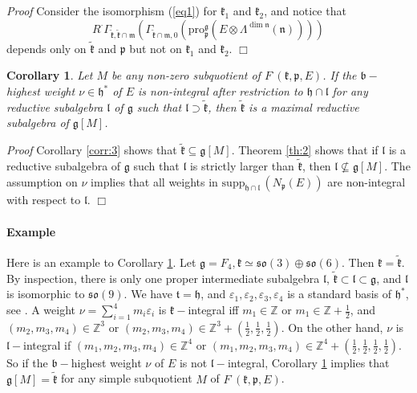 \documentclass[default]{./styles/svmult}
\newtheorem{cor}[theo]{Corollary}
\renewenvironment{proof}{ \emph{Proof}}{$\Box$}
\newcommand{\supp}{\mathrm{supp}}
\newcommand{\pro}{\mathrm{pro}}
\newcommand{\bb}{\mathfrak{b}}
\renewcommand{\gg}{\mathfrak{g}}
\newcommand{\hh}{\mathfrak{h}}
\newcommand{\kk}{\mathfrak{k}}
\renewcommand{\ll}{\mathfrak{l}}
\newcommand{\mm}{\mathfrak{m}}
\newcommand{\nn}{\mathfrak{n}}
\newcommand{\pp}{\mathfrak{p}}
\newcommand{\so}{\mathfrak{so}}
\renewcommand{\tt}{\mathfrak{t}}
\newcommand{\ZZ}{\mathbb{Z}}
\begin{document}
\begin{proof}
    Consider the isomorphism (\ref{eq1}) for $\kk_1$ and $\kk_2$, and notice that $$R^\cdot\Gamma_{\tilde{\kk},\tilde{\kk}\cap\mm}(\Gamma_{\tilde{\kk}\cap\mm,0}(\pro_\pp^\gg (E\otimes \Lambda^{\dim \nn}(\nn))))$$ depends only on $\tilde{\kk}$ and $\pp$ but not on $\kk_1$ and $\kk_2$.
\end{proof}

\begin{cor}\label{corr:5}
 Let $M$ be any non-zero subquotient of $F^{\cdot}(\kk,\pp,E)$. If the $\bb-$highest weight $\nu \in \hh^*$ of $E$ is non-integral after restriction to $\hh \cap \ll$ for any reductive subalgebra $\ll$ of $\gg$ such that $\ll \supset \tilde{\kk}$, then $\tilde{\kk}$ is a maximal reductive subalgebra of $\gg[M]$.
\end{cor}

\begin{proof}
 Corollary \ref{corr:3} shows that $\tilde{\kk} \subseteq \gg[M]$. Theorem \ref{th:2} shows that if $\ll$ is a reductive subalgebra of $\gg$ such that $\ll$ is strictly larger than $\tilde{\kk}$, then $\ll \nsubseteq \gg[M]$. The assumption on $\nu$ implies that all weights in $\supp_{\hh \cap \ll}\,(N_{\pp}(E))$ are non-integral with respect to $\ll$.   
\end{proof}

\paragraph{\textbf{Example}} Here is an example to Corollary \ref{corr:5}. Let $\gg = F_4, \kk \simeq \so(3) \oplus \so(6)$. Then $\kk = \tilde{\kk}$. By inspection, there is only one proper intermediate subalgebra $\ll$, $\tilde{\kk} \subset \ll \subset \gg$, and $\ll$ is isomorphic to $\so(9)$. We have $\tt = \hh$, and $\varepsilon_1,\varepsilon_2,\varepsilon_3,\varepsilon_4$ is a standard basis of $\hh^*$, see \cite{Bou}. A weight $\nu = \sum_{i = 1}^{4}m_i\varepsilon_i$ is $\kk-$integral iff $m_1 \in \ZZ$ or $m_1 \in \ZZ + \frac{1}{2}$, and $(m_2,m_3,m_4) \in \ZZ^3$ or $(m_2,m_3,m_4) \in \ZZ^3+(\frac{1}{2},\frac{1}{2},\frac{1}{2})$. On the other hand, $\nu$ is $\ll-$integral if $(m_1,m_2,m_3,m_4) \in \ZZ^4$ or $(m_1,m_2,m_3,m_4) \in \ZZ^4 + (\frac{1}{2},\frac{1}{2},\frac{1}{2},\frac{1}{2})$. So if the $\bb-$highest weight $\nu$ of $E$ is not $\ll-$integral, Corollary \ref{corr:5} implies that $\gg[M] = \tilde{\kk}$ for any simple subquotient $M$ of $F^\cdot(\kk,\pp,E)$. 
\end{document}
